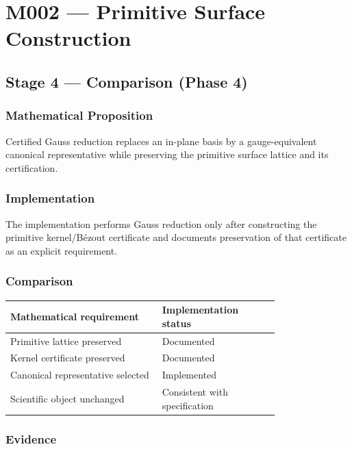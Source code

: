 
\chapter{M002 --- Primitive Surface Construction}

\section{Stage 4 --- Comparison (Phase 4)}

\subsection{Mathematical Proposition}

Certified Gauss reduction replaces an in-plane basis by a gauge-equivalent
canonical representative while preserving the primitive surface lattice
and its certification.

\subsection{Implementation}

The implementation performs Gauss reduction only after constructing the
primitive kernel/B\'ezout certificate and documents preservation of that
certificate as an explicit requirement.

\subsection{Comparison}

\begin{center}
\begin{tabular}{|p{0.44\linewidth}|p{0.34\linewidth}|}
\hline
Mathematical requirement & Implementation status\\
\hline
Primitive lattice preserved & Documented\\
Kernel certificate preserved & Documented\\
Canonical representative selected & Implemented\\
Scientific object unchanged & Consistent with specification\\
\hline
\end{tabular}
\end{center}

\subsection{Evidence}

